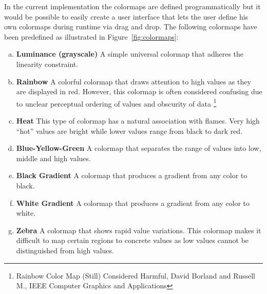 In the current implementation the colormaps are defined programmatically but it would be possible to easily create a user interface that lets the user define his own colormaps during runtime via drag and drop. The following colormaps have been predefined as illustrated in Figure~\ref{fig:colormaps}:
\begin{enumerate}[(a)]
    \item \textbf{Luminance (grayscale)} A simple universal colormap that adheres the linearity constraint. 
    \item \textbf{Rainbow} A colorful colormap that draws attention to high values as they are displayed in red. However, this colormap is often considered confusing due to unclear perceptual ordering of values and obscurity of data \footnote{Rainbow Color Map (Still) Considered Harmful, David Borland and Russell M., IEEE Computer Graphics and Applications} 
    \item \textbf{Heat} This type of colormap has a natural association with flames. Very high ``hot'' values are bright while lower values range from black to dark red.  
    \item \textbf{Blue-Yellow-Green} A colormap that separates the range of values into low, middle and high values. 
    \item \textbf{Black Gradient} A colormap that produces a gradient from any color to black.
    \item \textbf{White Gradient} A colormap that produces a gradient from any color to white.  
    \item \textbf{Zebra} A colormap that shows rapid value variations. This colormap makes it difficult to map certain regions to concrete values as low values cannot be distinguished from high values. 
\end{enumerate}   

